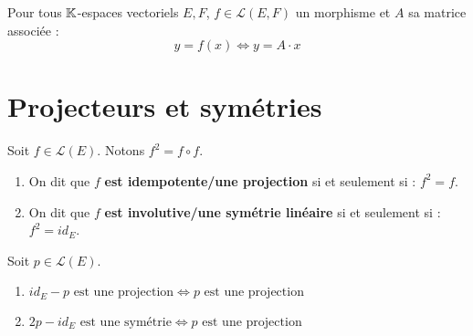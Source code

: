 \begin{proposition}
    Pour tous $\mathbb{K}$-espaces vectoriels $E, F$, $f \in \mathcal{L}(E, F)$ un morphisme et $A$ sa matrice associée :
    \[ y = f(x) \iff y = A \cdot x \]
\end{proposition}

\section{Projecteurs et symétries}
\begin{definition}
    Soit $f \in \mathcal{L}(E)$. Notons $f^2 = f \circ f$.
    \begin{enumerate}
        \item On dit que $f$ \textbf{est idempotente/une projection} si et seulement si : $f^2 = f$.
        \item On dit que $f$ \textbf{est involutive/une symétrie linéaire} si et seulement si : $f^2 = id_E$.
    \end{enumerate}
\end{definition}

\begin{proposition} 
    Soit $p \in \mathcal{L}(E)$.
    \begin{enumerate}
        \item $id_E - p \text{ est une projection} \iff p \text{ est une projection}$
        \item $2p - id_E \text{ est une symétrie} \iff p \text{ est une projection}$
    \end{enumerate}
\end{proposition}

